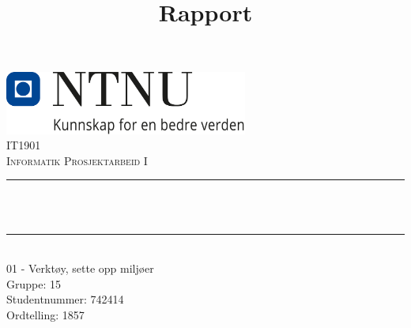 \documentclass[12pt,a4paper]{article}
\title{Rapport}
\def \fagkode{IT1901}
\def \fagtittel{Informatik Prosjektarbeid I}
\def \studentnummer{742414}
\def \gruppenummer{15}
\def \ordtelling{1857}
\def \tema{01 - Verktøy, sette opp miljøer}
\begin{document}
\makeatletter
\begin{titlepage}
    \begin{center}
    \includegraphics[width=0.60\textwidth]{NTNU_logo.png}\\[1cm]
    \textsc{\Large \fagkode}\\[0.5cm]
    \textsc{\large \fagtittel}\\[0.5cm]

    \rule{\linewidth}{0.5mm} \\[0.4cm]
    { \huge \bfseries \@title \\[0.4cm] }
    \rule{\linewidth}{0.5mm} \\[1.5cm]

    \LARGE
    \tema\\[1cm]

    \large
    Gruppe: \gruppenummer\\[0.25cm]

    \large
    Studentnummer: \studentnummer\\[0.25cm]

    \large
    Ordtelling: \ordtelling

    \vfill

    \large
    \@date
    \end{center}
\end{titlepage}
\makeatother
\end{document}
